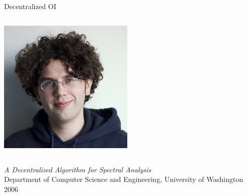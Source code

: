 \documentclass[xcolor=table,final]{beamer} %
\begin{document}
\begin{frame}{Decentralized OI}
\begin{columns}
\begin{center}
      \includegraphics[width=0.7\textwidth]{figs/extras/frank-mcsherry}
    \end{center}
  \end{columns}

  \begin{center}
    \textit{A Decentralized Algorithm for Spectral Analysis} \\
    Department of Computer Science and Engineering, University of Washington \\
    2006
  \end{center}
\end{frame}
\end{document}
